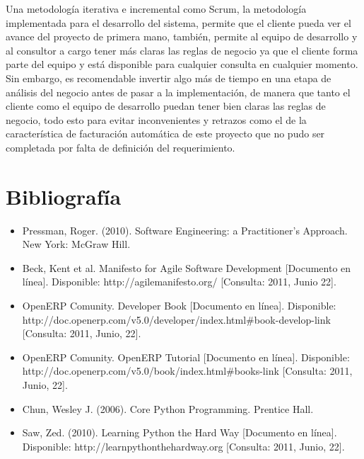 \documentclass[a4paper, 12pt]{article}
\begin{document}
Una metodología iterativa e incremental como Scrum, la metodología implementada para el desarrollo del sistema, permite que el cliente pueda ver el avance del proyecto de primera mano, también, permite al equipo de desarrollo y al consultor a cargo tener más claras las reglas de negocio ya que el cliente forma parte del equipo y está disponible para cualquier consulta en cualquier momento. Sin embargo, es recomendable invertir algo más de tiempo en una etapa de análisis del negocio antes de pasar a la implementación, de manera que tanto el cliente como el equipo de desarrollo puedan tener bien claras las reglas de negocio, todo esto para evitar inconvenientes y retrazos como el de la característica de facturación automática de este proyecto que no pudo ser completada por falta de definición del requerimiento.

\newpage
\section{Bibliografía}
\begin{itemize}
    \item Pressman, Roger. (2010). Software Engineering: a Practitioner's Approach. New York: McGraw Hill.
    \item Beck, Kent et al. Manifesto for Agile Software Development [Documento en línea]. Disponible: http://agilemanifesto.org/ [Consulta: 2011, Junio 22].
    \item OpenERP Comunity. Developer Book [Documento en línea]. Disponible: http://doc.openerp.com/v5.0/developer/index.html#book-develop-link [Consulta: 2011, Junio, 22].
    \item OpenERP Comunity. OpenERP Tutorial [Documento en línea]. Disponible: http://doc.openerp.com/v5.0/book/index.html#books-link [Consulta: 2011, Junio, 22].
    \item Chun, Wesley J. (2006). Core Python Programming. Prentice Hall.
    \item Saw, Zed. (2010). Learning Python the Hard Way [Documento en línea]. Disponible: http://learnpythonthehardway.org [Consulta: 2011, Junio, 22].
\end{itemize}
\end{document}
